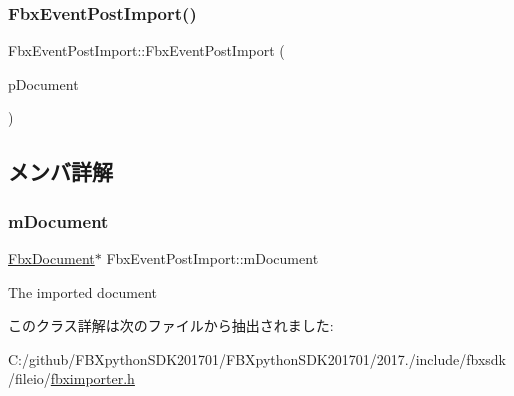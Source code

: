 \subsubsection{\texorpdfstring{Fbx\+Event\+Post\+Import()}{FbxEventPostImport()}}
{\footnotesize\ttfamily Fbx\+Event\+Post\+Import\+::\+Fbx\+Event\+Post\+Import (\begin{DoxyParamCaption}\item[{\hyperlink{class_fbx_document}{Fbx\+Document} $\ast$}]{p\+Document }\end{DoxyParamCaption})}



\subsection{メンバ詳解}
\mbox{\label{class_fbx_event_post_import_a9e7d9e8702a8e82a81409d1393845a1a}} 
\subsubsection{\texorpdfstring{m\+Document}{mDocument}}
{\footnotesize\ttfamily \hyperlink{class_fbx_document}{Fbx\+Document}$\ast$ Fbx\+Event\+Post\+Import\+::m\+Document}



The imported document 



このクラス詳解は次のファイルから抽出されました\+:\begin{DoxyCompactItemize}
\item 
C\+:/github/\+F\+B\+Xpython\+S\+D\+K201701/\+F\+B\+Xpython\+S\+D\+K201701/2017./include/fbxsdk/fileio/\hyperlink{fbximporter_8h}{fbximporter.\+h}\end{DoxyCompactItemize}
